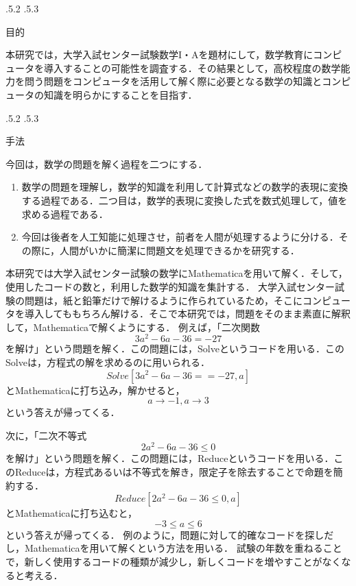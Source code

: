 \documentclass[uplatex,twocolumn]{jsarticle}
\makeatletter
\renewcommand{\section}{%
    \if@slide\clearpage\fi
    \@startsection{section}{1}{\z@}%
    {\Cvs \@plus.5\Cdp \@minus.2\Cdp}%
    {.5\Cvs \@plus.3\Cdp}%
    {\normalfont\raggedright}}
\makeatother
\begin{document}
\section{目的}

本研究では，大学入試センター試験数学I・Aを題材にして，数学教育にコンピュータを導入することの可能性を調査する．その結果として，高校程度の数学能力を問う問題をコンピュータを活用して解く際に必要となる数学の知識とコンピュータの知識を明らかにすることを目指す．





\section{手法}

今回は，数学の問題を解く過程を二つにする．
\begin{enumerate}
\item 数学の問題を理解し，数学的知識を利用して計算式などの数学的表現に変換する過程である．二つ目は，数学的表現に変換した式を数式処理して，値を求める過程である．
\item 今回は後者を人工知能に処理させ，前者を人間が処理するように分ける．その際に，人間がいかに簡潔に問題文を処理できるかを研究する．
\end{enumerate}
 
本研究では大学入試センター試験の数学にMathematicaを用いて解く．そして，使用したコードの数と，利用した数学的知識を集計する．
大学入試センター試験の問題は，紙と鉛筆だけで解けるように作られているため，そこにコンピュータを導入してももちろん解ける．そこで本研究では，問題をそのまま素直に解釈して，Mathematicaで解くようにする．
例えば，「二次関数\[3a^2 -6a-36=-27\]を解け」という問題を解く．この問題には，Solveというコードを用いる．このSolveは，方程式の解を求めるのに用いられる．\[Solve[3a^2 -6a-36==-27,a]\]とMathematicaに打ち込み，解かせると，\[{{a \rightarrow -1},{a \rightarrow 3}}\]という答えが帰ってくる．

次に，「二次不等式\[2a^2 -6a-36 \le 0\]を解け」という問題を解く．この問題には，Reduceというコードを用いる．このReduceは，方程式あるいは不等式を解き，限定子を除去することで命題を簡約する．\[Reduce[2a^2 -6a-36 \le 0,a]\]とMathematicaに打ち込むと，\[-3 \le a \le 6\]という答えが帰ってくる．
例のように，問題に対して的確なコードを探しだし，Mathematicaを用いて解くという方法を用いる．
試験の年数を重ねることで，新しく使用するコードの種類が減少し，新しくコードを増やすことがなくなると考える．
\end{document}
